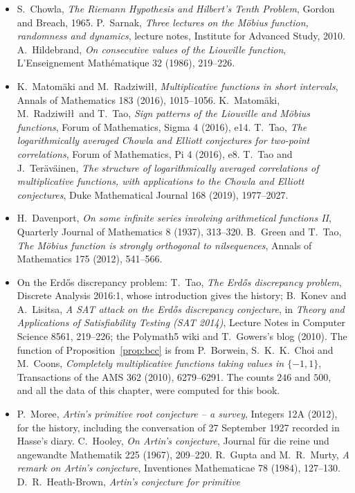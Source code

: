 \begin{itemize}
\item S.~Chowla, \emph{The Riemann Hypothesis and Hilbert's Tenth Problem}, Gordon and Breach, 1965. P.~Sarnak, \emph{Three lectures on the M\"obius
function, randomness and dynamics}, lecture notes, Institute for Advanced Study, 2010. A.~Hildebrand, \emph{On consecutive values of the Liouville function},
L'Enseignement Math\'ematique 32 (1986), 219--226.
\item K.~Matom\"aki and M.~Radziwi\l\l, \emph{Multiplicative functions in short intervals}, Annals of Mathematics 183 (2016), 1015--1056. K.~Matom\"aki,
M.~Radziwi\l\l\ and T.~Tao, \emph{Sign patterns of the Liouville and M\"obius functions}, Forum of Mathematics, Sigma 4 (2016), e14. T.~Tao, \emph{The
logarithmically averaged Chowla and Elliott conjectures for two-point correlations}, Forum of Mathematics, Pi 4 (2016), e8. T.~Tao and J.~Ter\"av\"ainen,
\emph{The structure of logarithmically averaged correlations of multiplicative functions, with applications to the Chowla and Elliott conjectures}, Duke
Mathematical Journal 168 (2019), 1977--2027.
\item H.~Davenport, \emph{On some infinite series involving arithmetical functions II}, Quarterly Journal of Mathematics 8 (1937), 313--320. B.~Green and
T.~Tao, \emph{The M\"obius function is strongly orthogonal to nilsequences}, Annals of Mathematics 175 (2012), 541--566.
\item On the Erd\H os discrepancy problem: T.~Tao, \emph{The Erd\H os discrepancy problem}, Discrete Analysis 2016:1, whose introduction gives the history;
B.~Konev and A.~Lisitsa, \emph{A SAT attack on the Erd\H os discrepancy conjecture}, in \emph{Theory and Applications of Satisfiability Testing (SAT 2014)},
Lecture Notes in Computer Science 8561, 219--226; the Polymath5 wiki and T.~Gowers's blog (2010). The function of Proposition~\ref{prop:bcc} is from
P.~Borwein, S.~K.~K.~Choi and M.~Coons, \emph{Completely multiplicative functions taking values in $\{-1,1\}$}, Transactions of the AMS 362 (2010),
6279--6291. The counts $246$ and $500$, and all the data of this chapter, were computed for this book.
\item P.~Moree, \emph{Artin's primitive root conjecture -- a survey}, Integers 12A (2012), for the history, including the conversation of 27 September 1927
recorded in Hasse's diary. C.~Hooley, \emph{On Artin's conjecture}, Journal f\"ur die reine und angewandte Mathematik 225 (1967), 209--220. R.~Gupta and
M.~R.~Murty, \emph{A remark on Artin's conjecture}, Inventiones Mathematicae 78 (1984), 127--130. D.~R.~Heath-Brown, \emph{Artin's conjecture for primitive
}
\end{itemize}
